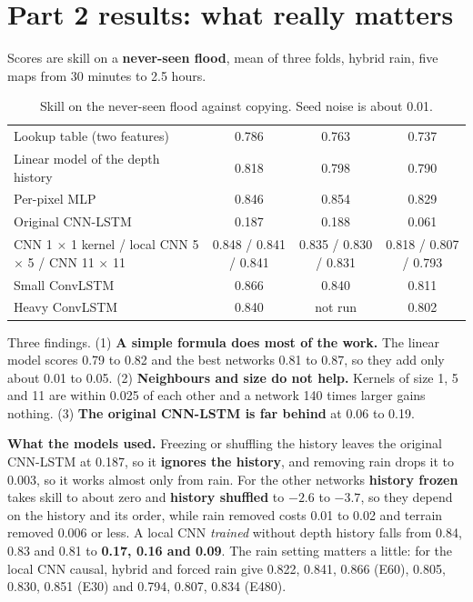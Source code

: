 \section{Part 2 results: what really matters}\label{ch:res2}

Scores are skill on a \textbf{never-seen flood}, mean of three folds, hybrid rain, five maps from 30 minutes to 2.5 hours.

\begin{table}[!htbp]
\centering\small
\caption{Skill on the never-seen flood against copying. Seed noise is about 0.01.}
\begin{tabularx}{\linewidth}{|Y|c|c|c|}
\hline
{}  &  &  & \\ \hline
Lookup table (two features) & 0.786 & 0.763 & 0.737\\ \hline
Linear model of the depth history & 0.818 & 0.798 & 0.790\\ \hline
Per-pixel MLP & 0.846 & 0.854 & 0.829\\ \hline
Original CNN-LSTM & 0.187 & 0.188 & 0.061\\ \hline
CNN 1 $\times$ 1 kernel / local CNN 5 $\times$ 5 / CNN 11 $\times$ 11 & 0.848 / 0.841 / 0.841 & 0.835 / 0.830 / 0.831 & 0.818 / 0.807 / 0.793\\ \hline
Small ConvLSTM & 0.866 & 0.840 & 0.811\\ \hline
Heavy ConvLSTM & 0.840 & not run & 0.802\\ \hline
\end{tabularx}
\end{table}

Three findings. (1) \textbf{A simple formula does most of the work.} The linear model scores 0.79 to 0.82 and the best networks 0.81 to 0.87, so they add only about 0.01 to 0.05. (2) \textbf{Neighbours and size do not help.} Kernels of size 1, 5 and 11 are within 0.025 of each other and a network 140 times larger gains nothing. (3) \textbf{The original CNN-LSTM is far behind} at 0.06 to 0.19.

\textbf{What the models used.} Freezing or shuffling the history leaves the original CNN-LSTM at 0.187, so it \textbf{ignores the history}, and removing rain drops it to 0.003, so it works almost only from rain. For the other networks \textbf{history frozen} takes skill to about zero and \textbf{history shuffled} to $-2.6$ to $-3.7$, so they depend on the history and its order, while rain removed costs 0.01 to 0.02 and terrain removed 0.006 or less. A local CNN \emph{trained} without depth history falls from 0.84, 0.83 and 0.81 to \textbf{0.17, 0.16 and 0.09}. The rain setting matters a little: for the local CNN causal, hybrid and forced rain give 0.822, 0.841, 0.866 (E60), 0.805, 0.830, 0.851 (E30) and 0.794, 0.807, 0.834 (E480).

